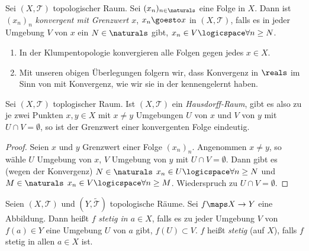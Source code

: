 \begin{definition} \label{konvergenz_in_topologischen_raeumen}
    Sei \( (X, \mathcal{T}) \) topologischer Raum.
    Sei \( (x_n)_{n\in \naturals} \) eine Folge in \( X \).
    Dann ist \( (x_n)_{n} \) \emph{konvergent mit Grenzwert \( x \)}, \( x_n\goesto x \) in \( (X, \mathcal{T}) \), falls es in jeder Umgebung \( V \) von \( x  \) ein \( N\in \naturals \) gibt, \sd \( x_n\in V\logicspace\forall n\geq N \).
    
\end{definition}

\begin{beispiele*}
    \begin{enumerate}
        \item In der Klumpentopologie konvergieren alle Folgen gegen jedes \( x\in X \).
        \item Mit unseren obigen Überlegungen folgern wir, dass Konvergenz in \( \reals \) im Sinn von  mit Konvergenz, wie wir sie in der  kennengelernt haben.
    \end{enumerate}
\end{beispiele*}
\begin{lemma}\label{hausdorff_alle_grenzwerte_eindeutig}
    Sei \( (X,\mathcal{T}) \) toplogischer Raum. 
    Ist \( (X, \mathcal{T}) \) ein \emph{Hausdorff-Raum}, gibt es also zu je zwei Punkten \( x,y\in X \) mit \( x\neq y \) Umgebungen \( U \) von \( x \) und \( V \) von \( y \) mit \( U \cap V=\emptyset \), so ist der Grenzwert einer konvergenten Folge eindeutig.
\end{lemma}
\begin{proof}
    Seien \( x \) und \( y \) Grenzwert einer Folge \( (x_n)_n \).
    Angenommen \( x\neq y \), so wähle \( U \) Umgebung von \( x \), \( V \) Umgebung von \( y \) mit \( U\cap V=\emptyset \). 
    Dann gibt es (wegen der Konvergenz) \( N \in \naturals \) \sd \( x_n \in U \logicspace\forall n \geq N \) und \( M\in \naturals \) \sd \( x_n \in V \logicspace \forall n \geq M \). 
    Wiederspruch zu \( U\cap V = \emptyset \). 
\end{proof}
\begin{definition}\label{stetigkeit_in_topologischen_raeumen}
    Seien \( (X, \mathcal{T}) \) und \( (Y,\tilde{\mathcal{T}}) \) topologische Räume. 
    Sei \( f\maps X\to Y \) eine Abbildung. 
    Dann heißt \( f \) \emph{stetig in \( a\in X \)}, falls es zu jeder Umgebung \( V \) von \( f(a)\in Y \) eine Umgebung \( U \) von \( a \) gibt, \sd \( f(U)\subset V \). 
    \( f \) heißt \emph{stetig} (auf \( X \)), falls \( f \) stetig in allen \( a\in X \) ist.
\end{definition}
